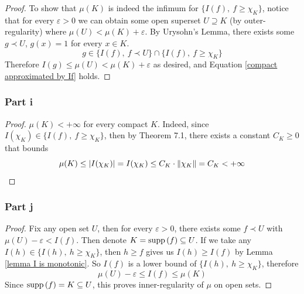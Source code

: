 \documentclass[../../main.tex]{subfiles}
\begin{document}
\begin{proof}
To show that $\mu(K)$ is indeed the infimum for $\{I(f),\: f\geq \chi_K\}$, notice that for every $\varepsilon>0$ we can obtain some open superset $U\supseteq K$ (by outer-regularity) where $\mu(U)<\mu(K)+\varepsilon$. By Urysohn's Lemma, there exists some $g\prec U$, $g(x)=1$ for every $x\in K$.
\[
g\in \{I(f),\: f\prec U\}\cap\{I(f),\: f\geq\chi_K\}
\]
Therefore $I(g)\leq\mu(U)<\mu(K)+\varepsilon$ as desired, and Equation \eqref{compact approximated by If} holds.
\end{proof}
\subsubsection{Part i}
\begin{proof}
$\mu(K)<+\infty$ for every compact $K$. Indeed, since $I(\chi_K)\in\{I(f),\:f\geq\chi_K\}$, then by Theorem 7.1, there exists a constant $C_K\geq 0$ that bounds
\[
\mu(K)\leq |I(\chi_K)| = I(\chi_K)\leq C_K\cdot \lVert {\chi_K} \rVert = C_K<+\infty
\]
\end{proof}
\subsubsection{Part j}
\begin{proof}
Fix any open set $U$, then for every $\varepsilon>0$, there exists some $f\prec U$ with $\mu(U)-\varepsilon<I(f)$. Then denote $K=\operatorname{supp}{(f)}\subseteq U$. If we take any $I(h)\in\{I(h),\:h\geq \chi_K\}$, then $h\geq f$ gives us $I(h)\geq I(f)$ by Lemma \ref{lemma I is monotonic}. So $I(f)$ is a lower bound of $\{I(h),\: h\geq \chi_K\}$, therefore
\[
\mu(U)-\varepsilon\leq I(f)\leq \mu(K)
\]
Since $\operatorname{supp}{(f)}=K\subseteq U$, this proves inner-regularity of $\mu$ on open sets.
\end{proof}
\end{document}
